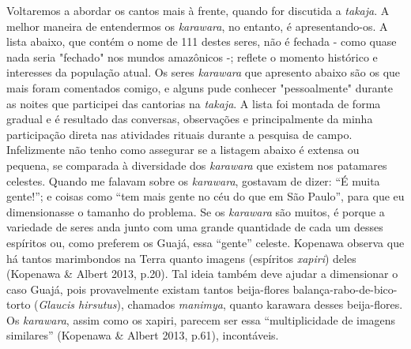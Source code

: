 
Voltaremos a abordar os cantos mais à frente, quando for discutida a
\emph{takaja}. A melhor maneira de entendermos os \emph{karawara}, no
entanto, é apresentando-os. A lista abaixo, que contém o nome de 111
destes seres, não é fechada - como quase nada seria "fechado" nos mundos
amazônicos -; reflete o momento histórico e interesses da população
atual. Os seres \emph{karawara} que apresento abaixo são os que mais
foram comentados comigo, e alguns pude conhecer "pessoalmente" durante
as noites que participei das cantorias na \emph{takaja}. A lista foi
montada de forma gradual e é resultado das conversas, observações e
principalmente da minha participação direta nas atividades rituais
durante a pesquisa de campo. Infelizmente não tenho como assegurar se a
listagem abaixo é extensa ou pequena, se comparada à diversidade dos
\emph{karawara} que existem nos patamares celestes. Quando me falavam
sobre os \emph{karawara}, gostavam de dizer: ``É muita gente!''; e
coisas como ``tem mais gente no céu do que em São Paulo'', para que eu
dimensionasse o tamanho do problema. Se os \emph{karawara} são muitos, é
porque a variedade de seres anda junto com uma grande quantidade de cada
um desses espíritos ou, como preferem os Guajá, essa ``gente'' celeste.
Kopenawa observa que há tantos marimbondos na Terra quanto imagens
(espíritos \emph{xapiri}) deles (Kopenawa \& Albert 2013, p.20). Tal
ideia também deve ajudar a dimensionar o caso Guajá, pois provavelmente
existam tantos beija-flores balança-rabo-de-bico-torto (\emph{Glaucis
hirsutus}), chamados \emph{manimya}, quanto karawara desses
beija-flores. Os \emph{karawara}, assim como os xapiri, parecem ser essa
``multiplicidade de imagens similares'' (Kopenawa \& Albert 2013, p.61),
incontáveis.

